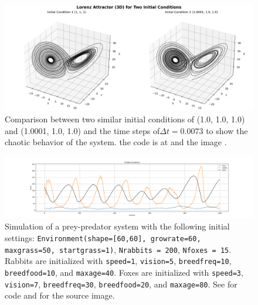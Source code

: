 \begin{figure}[!ht]
  \centering
  \includegraphics[width=0.9\linewidth]{images/two_initial_conditions_3d_separate_3.png}
  \caption{Comparison between two similar initial conditions of (1.0, 1.0, 1.0) and (1.0001, 1.0, 1.0) and
the time steps of$\Delta t = 0.0073$ to show the chaotic behavior of the system. the code is at \cite{youngaryantwo_initial_conditions_3d_separateICode} and the image \cite{youngaryantwo_initial_conditions_3d_3separateICode}.}
  \label{fig:two_initial_conditions_3d_separate_3}
\end{figure}



\begin{figure}[!ht]
  \centering
  \includegraphics[width=0.9\linewidth]{images/Ecolab_simulation.png}
  \caption{Simulation of a prey-predator system with the following initial settings: \texttt{Environment(shape=[60,60], growrate=60, maxgrass=50, startgrass=1)}, \texttt{Nrabbits = 200}, \texttt{Nfoxes = 15}. Rabbits are initialized with \texttt{speed=1}, \texttt{vision=5}, \texttt{breedfreq=10}, \texttt{breedfood=10}, and \texttt{maxage=40}. Foxes are initialized with \texttt{speed=3}, \texttt{vision=7}, \texttt{breedfreq=30}, \texttt{breedfood=20}, and \texttt{maxage=80}. See \cite{youngaryantwo_initial_conditions_3d_separateICode} for code and \cite{youngaryantwo_initial_conditions_3d_3separateICode} for the source image.}
  \label{fig:Ecolab_pred_prey}
\end{figure}


